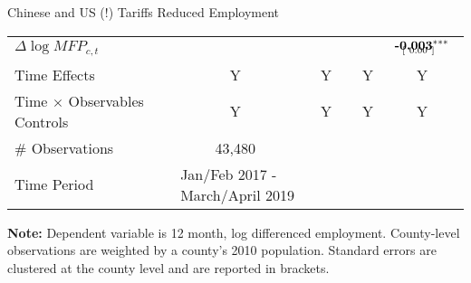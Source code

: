 \documentclass[9pt,pdftex,aspectratio=1610]{beamer}
\theoremstyle{definition}
\begin{document}
\begin{frame}[t]{Chinese and US (!) Tariffs Reduced Employment}
\begin{table}[t]
\begin{center}
\begin{tabular}{l c c c c}
$\Delta \log MFP_{c,t}$
&
&
&
& $\begin{array}{c}\textbf{-0.003}^{***}  \vspace{-.32cm}\\ \scriptstyle \phantom{-}[ \ 0.00 \ ]\phantom{^{***}} \end{array}$
\\

Time Effects            &Y & Y  & Y & Y \\
Time $\times$ Observables Controls    &Y & Y  & Y & Y \\
\hline
\# Observations & 43,480 \\
Time Period & \multicolumn{2}{l}{Jan/Feb 2017 - March/April 2019}\\
\hline
\end{tabular}
\parbox[c]{4.1in}{\vspace{.1cm}
{\footnotesize \textbf{Note:} Dependent variable is 12 month, log differenced employment. County-level observations are weighted by a county's 2010 population. Standard errors are clustered at the county level and are reported in brackets.}}
\end{center}
\end{table}
\end{frame}

\end{document}
